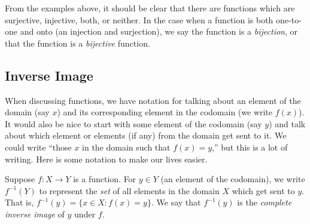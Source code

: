 \documentclass[10pt,]{book}
\theoremstyle{plain}
\theoremstyle{definition}
\theoremstyle{definition}
\theoremstyle{definition}
\def\inv{^{-1}}
\def\st{:}
\begin{document}
      From the examples above, it should be clear that there are functions which are surjective, injective, both, or neither. In the case when a function is both one-to-one and onto (an injection and surjection), we say the function is a \emph{bijection}, or that the function is a \emph{bijective} function.
\typeout{************************************************}
\typeout{************************************************}
\subsection[Inverse Image]{Inverse Image}\label{subsection-9}

      When discussing functions, we have notation for talking about an element of the domain (say \(x\)) and its corresponding element in the codomain (we write \(f(x)\)). It would also be nice to start with some element of the codomain (say \(y\)) and talk about which element or elements (if any) from the domain get sent to it. We could write ``those \(x\) in the domain such that \(f(x) = y\),'' but this is a lot of writing. Here is some notation to make our lives easier.
\par

      Suppose \(f:X \to Y\) is a function. For \(y \in Y\) (an element of the codomain), we write \(f\inv(Y)\)\index{\(f\inv(Y)\)} to represent the \emph{set} of all elements in the domain \(X\) which get sent to \(y\). That is, \(f\inv(y) = \{x \in X \st f(x) = y\}\). We say that \(f\inv(y)\) is the \emph{complete inverse image} of \(y\) under \(f\).
\par
\end{document}

